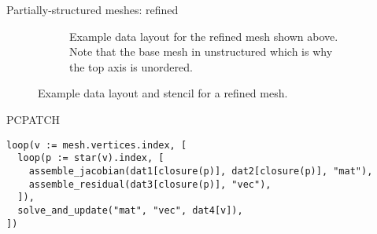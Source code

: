 \documentclass{beamer}
\begin{document}
\begin{frame}{Partially-structured meshes: refined}
\begin{figure}
\begin{subfigure}{\textwidth}
      \caption{
        Example data layout for the refined mesh shown above.
        Note that the base mesh in unstructured which is why the top axis is unordered.
      }
      \label{fig:refined_data}
    \end{subfigure}
    \caption{Example data layout and stencil for a refined mesh.}
    \label{fig:refined_patch_and_data}
  \end{figure}
\end{frame}

\begin{frame}[fragile]{PCPATCH}
  \begin{verbatim}
loop(v := mesh.vertices.index, [
  loop(p := star(v).index, [
    assemble_jacobian(dat1[closure(p)], dat2[closure(p)], "mat"),
    assemble_residual(dat3[closure(p)], "vec"),
  ]),
  solve_and_update("mat", "vec", dat4[v]),
])
\end{verbatim}

\end{frame}
\end{document}
